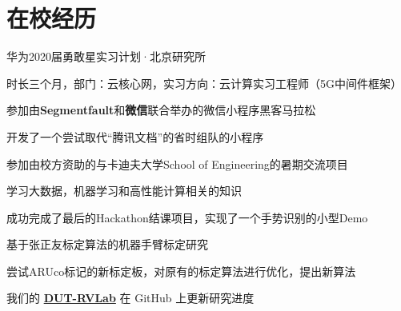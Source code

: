 \documentclass[]{deedy-resume-openfont}
\begin{document}
\begin{minipage}[t]{0.73\textwidth} 


\section{在校经历}
\vspace{\topsep}
\begin{tightemize}
    \item 华为2020届勇敢星实习计划·北京研究所
    \item 时长三个月，部门：云核心网，实习方向：云计算实习工程师（5G中间件框架）
    \end{tightemize}
\sectionsep

\begin{tightemize}
    \item 参加由\textbf{Segmentfault}和\textbf{微信}联合举办的微信小程序黑客马拉松
    \item 开发了一个尝试取代“腾讯文档”的省时组队的小程序
    \end{tightemize}
\sectionsep

\begin{tightemize}
    \item 参加由校方资助的与卡迪夫大学School of Engineering的暑期交流项目
    \item 学习大数据，机器学习和高性能计算相关的知识
    \item 成功完成了最后的Hackathon结课项目，实现了一个手势识别的小型Demo
    \end{tightemize}
\sectionsep

\sectionsep
{}
\begin{tightemize}
    \item 基于张正友标定算法的机器手臂标定研究
    \item 尝试ARUco标记的新标定板，对原有的标定算法进行优化，提出新算法
    \item 我们的 \href{https://github.com/DUT-RVLab}{\bf DUT-RVLab} 在 GitHub 上更新研究进度
    \end{tightemize}
\sectionsep


\end{minipage}
\end{document}

